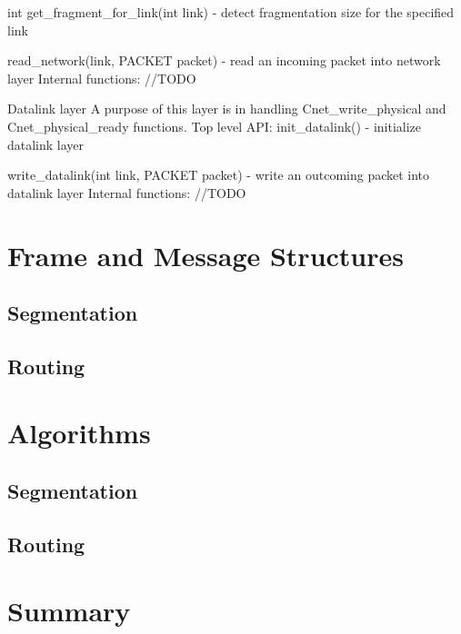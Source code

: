 \documentclass{article}
\begin{document}
			int get_fragment_for_link(int link) - detect fragmentation size for the
			specified link
		
			read_network(link, PACKET packet) - read an incoming packet into network
			layer
		Internal functions:
			//TODO
		
		
	Datalink layer
		A purpose of this layer is in handling Cnet_write_physical and
		Cnet_physical_ready functions. 
		Top level API:
			init_datalink() - initialize datalink layer
		
			write_datalink(int link, PACKET packet) - write an outcoming packet into
			datalink layer
		Internal functions:
			//TODO



\section{Frame and Message Structures}

\subsection{Segmentation}

\subsection{Routing}

\section{Algorithms}

\subsection{Segmentation}

\subsection{Routing}

\section{Summary}
\end{document}
